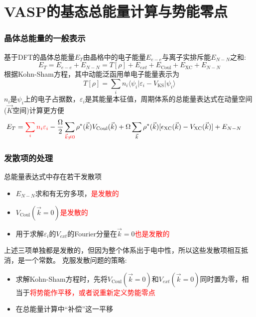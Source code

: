 \documentclass[cjk,slidestop,handout,compress,mathserif,blue]{beamer}	%
\begin{document}
\section{\rm{VASP}的基态总能量计算与势能零点}
\frame
{
	\frametitle{晶体总能量的一般表示}
基于\textrm{DFT}的晶体总能量$E_T$由晶格中的电子能量$E_{e-e}$与离子实排斥能$E_{N-N}$之和:~
	\begin{displaymath}
		E_T=E_{e-e}+E_{N-N}=T[\rho]+E_{ext}+E_{\mathrm{Coul}}+E_{\mathrm{XC}}+E_{N-N}
	\end{displaymath}
根据\textrm{Kohn-Sham}方程，其中动能泛函用单电子能量表示为
\begin{displaymath}
	T[{\rho}]=\sum_in_i\langle\psi_i|\varepsilon_i-V_{\mathrm{KS}}|\psi_i\rangle
\end{displaymath}
$n_i$是$\psi_i$上的电子占据数，$\varepsilon_i$是其能量本征值，周期体系的总能量表达式在动量空间($\vec K$空间)计算更方便
\begin{displaymath}
	\hspace*{-15.0pt}	E_T=\textcolor{red}{\sum_in_i\varepsilon_i}-\dfrac{\Omega}2\sum_{\textcolor{red}{\vec k\neq 0}}\rho^{\ast}(\vec k)V_{\mathrm{Coul}}(\vec k)+\Omega\sum_{\vec k}\rho^{\ast}(\vec k)[\epsilon_{\mathrm{XC}}(\vec k)-V_{\mathrm{XC}}(\vec k)]+E_{N-N}
\end{displaymath}
}

\frame
{
	\frametitle{发散项的处理}
总能量表达式中存在若干发散项
\begin{itemize}
	\item $E_{N-N}$求和有无穷多项，\textcolor{red}{是发散的}
	\item $V_{\mathrm{Coul}}(\vec k=0)$\textcolor{red}{是发散的}
	\item 用于求解$\varepsilon_i$的$V_{ext}$的\textrm{Fourier}分量在$\vec k=0$\textcolor{red}{也是发散的}
\end{itemize}
上述三项单独都是发散的，但因为整个体系出于电中性，所以这些发散项相互抵消，是一个常数。
\vskip 10pt
克服发散问题的策略:
\begin{itemize}
	\item 求解\textrm{Kohn-Sham}方程时，先将$V_{\mathrm{Coul}}(\vec k=0)$和$V_{ext}(\vec k=0)$同时置为零，相当于\textcolor{red}{将势能作平移，或者说重新定义势能零点}
	\item 在总能量计算中“补偿”这一平移
\end{itemize}
}
\end{document}
